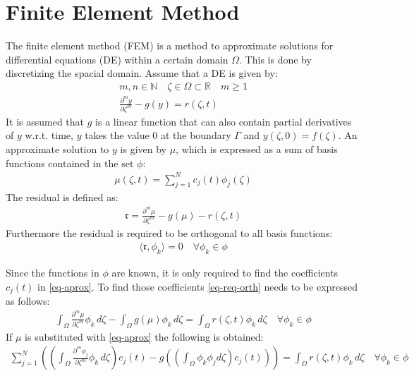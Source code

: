 \section{Finite Element Method} \label{FEM}
The finite element method (FEM) is a method to approximate solutions for differential equations (DE) within a certain domain \(\Omega\).
This is done by discretizing the spacial domain.
Assume that a DE is given by:
\begin{gather}
m, n \in \mathbb{N} \quad \zeta \in \Omega \subset \mathbb{R} \quad m \geq 1 \\
\frac{\partial^{m} y}{\partial \zeta^{m}} -  g(y) = r(\zeta, t) \label{eq-pde-gen} 
\end{gather}
It is assumed that \(g\) is a linear function that can also contain partial derivatives of \(y\) w.r.t. time, \(y\) takes the value 0 at the boundary \(\Gamma\) and \(y(\zeta, 0) = f(\zeta)\).
An approximate solution to \(y\) is given by \(\mu\), which is expressed as a sum of basis functions contained in the set \(\phi\):
\begin{gather}
\mu(\zeta, t) = \sum_{j = 1}^{N} c_{j}(t)\phi_{j}(\zeta) \label{eq-aprox}
\end{gather}
The residual is defined as:
\begin{gather}
\mathfrak{r} = \frac{\partial^{m} \mu}{\partial \zeta^{m}} -  g(\mu) - r(\zeta, t) 
\end{gather}
Furthermore the residual is required to be orthogonal to all basis functions:
\begin{gather}
\langle \mathfrak{r}, \phi_{k} \rangle = 0 \quad \forall \phi_{k} \in \phi \label{eq-req-orth}
\end{gather}

Since the functions in \(\phi\) are known, it is only required to find the coefficients \(c_{j}(t)\) in \ref{eq-aprox}.
To find those coefficients \ref{eq-req-orth} needs to be expressed as follows:
\begin{gather}
\int_{\Omega} \frac{\partial^{m} \mu}{\partial \zeta^{m}} \phi_{k} \, d\zeta  -  \int_{\Omega} g(\mu) \phi_{k}        \, d\zeta = \int_{\Omega}  r(\zeta, t) \phi_{k}        \, d\zeta \quad \forall \phi_{k} \in \phi 
\end{gather}
If \(\mu\) is substituted with \ref{eq-aprox} the following is obtained:
\begin{gather}
\sum_{j = 1}^{N} ((\int_{\Omega} \frac{\partial^{m} \phi_{j}}{\partial \zeta^{m}} \phi_{k} \, d\zeta) c_{j}(t) - g((\int_{\Omega} \phi_k \phi_j d\zeta) c_{j}(t)))  = \int_{\Omega}  r(\zeta, t) \phi_{k}        \, d\zeta \quad \forall \phi_{k} \in \phi \label{eq-al}
\end{gather}

